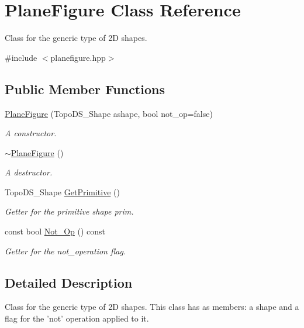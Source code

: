 \hypertarget{class_plane_figure}{
\section{PlaneFigure Class Reference}
\label{class_plane_figure}
}


Class for the generic type of 2D shapes.  




{\ttfamily \#include $<$planefigure.hpp$>$}

\subsection*{Public Member Functions}
\begin{DoxyCompactItemize}
\item 
\hyperlink{class_plane_figure_acfb68dcceebec0d3ca6eac3a4c4d230d}{PlaneFigure} (TopoDS\_\-Shape ashape, bool not\_\-op=false)
\begin{DoxyCompactList}\small\item\em A constructor. \item\end{DoxyCompactList}\item 
\hyperlink{class_plane_figure_aa08d8ad8ede4517fedc0119710cfd309}{$\sim$PlaneFigure} ()
\begin{DoxyCompactList}\small\item\em A destructor. \item\end{DoxyCompactList}\item 
TopoDS\_\-Shape \hyperlink{class_plane_figure_acc4fa0efcd331ca7c8e237728eb8942f}{GetPrimitive} ()
\begin{DoxyCompactList}\small\item\em Getter for the primitive shape prim. \item\end{DoxyCompactList}\item 
const bool \hyperlink{class_plane_figure_a656c11955204315b5df3a13914d3210b}{Not\_\-Op} () const 
\begin{DoxyCompactList}\small\item\em Getter for the not\_\-operation flag. \item\end{DoxyCompactList}\end{DoxyCompactItemize}


\subsection{Detailed Description}
Class for the generic type of 2D shapes. This class has as members: a shape and a flag for the 'not' operation applied to it. 

